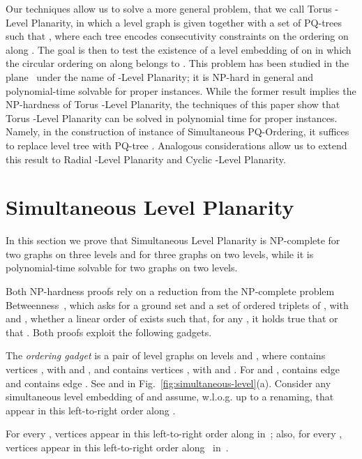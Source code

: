 \documentclass{llncs}
\newcommand{\NPC}{\mbox{NP-complete}\xspace}
\newcommand{\Gr}[1]{\xspace}
\newcommand{\Gb}[1]{\xspace}
\newcommand{\sefeinstance}[1]{\xspace}
\begin{document}
Our techniques allow us to solve a more general problem, that we call {\sc Torus -Level Planarity}, in which a level graph  is given together with a set of PQ-trees  such that , where each tree  encodes consecutivity constraints on the ordering on  along . The goal is then to test the existence of a level embedding of  on  in which the circular ordering on  along  belongs to . 
This problem has been studied in the plane~\cite{tibp-addfr-15,wsp-gktlg-12} under the name of {\sc -Level Planarity}; it is NP-hard in general and polynomial-time solvable for proper instances. While the former result implies the NP-hardness of {\sc Torus -Level Planarity}, the techniques of this paper show that {\sc Torus -Level Planarity} can be solved in polynomial time for proper instances. Namely, in the construction of instance  of {\sc Simultaneous PQ-Ordering}, it suffices to replace level tree  with PQ-tree . Analogous considerations allow us to extend this result to {\sc Radial -Level Planarity} and {\sc Cyclic -Level Planarity}.

\section{Simultaneous Level Planarity} \label{se:simultaneous}

In this section we prove that  {\sc Simultaneous Level Planarity} is \NPC for two graphs on three levels and for three graphs on two levels, while it is polynomial-time solvable for two graphs on two levels. 

Both NP-hardness proofs rely on a reduction from the \NPC problem {\sc Betweenness}~\cite{o-top-79}, which asks for a ground set  and a set  of ordered triplets of , with  and , whether a linear order  of  exists such that, for any , it holds true that  or that . Both proofs exploit the following gadgets. 

The {\em ordering gadget} is a pair \sefeinstance{} of level graphs on levels  and , where  contains  vertices , with  and , and  contains  vertices , with  and . For  and , \Gr{} contains edge  and \Gb{} contains edge . See \Gr{} and \Gb{} in Fig.~\ref{fig:simultaneous-level}(a). Consider any simultaneous level embedding  of \sefeinstance{} and assume, w.l.o.g. up to a renaming, that  appear in this left-to-right order along .

\begin{lemma} \label{le:sl-ordering}
For every , vertices  appear in this left-to-right order along  in~; also, for every , vertices  appear in this left-to-right order along~ in~. 
\end{lemma} 
\end{document}
